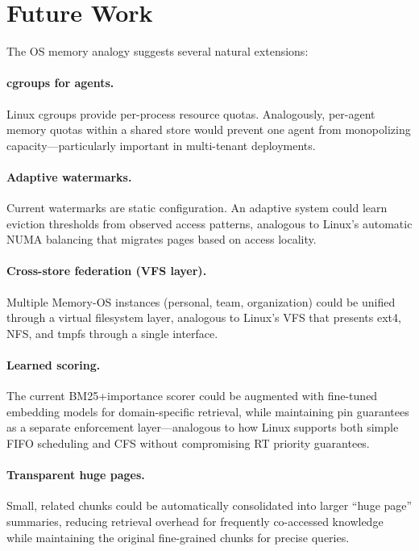 \documentclass[10pt,twocolumn]{article}
\begin{document}
\section{Future Work}
\label{sec:future}

The OS memory analogy suggests several natural extensions:

\paragraph{cgroups for agents.} Linux cgroups provide per-process resource quotas. Analogously, per-agent memory quotas within a shared store would prevent one agent from monopolizing capacity---particularly important in multi-tenant deployments.

\paragraph{Adaptive watermarks.} Current watermarks are static configuration. An adaptive system could learn eviction thresholds from observed access patterns, analogous to Linux's automatic NUMA balancing that migrates pages based on access locality.

\paragraph{Cross-store federation (VFS layer).} Multiple Memory-OS instances (personal, team, organization) could be unified through a virtual filesystem layer, analogous to Linux's VFS that presents ext4, NFS, and tmpfs through a single interface.

\paragraph{Learned scoring.} The current BM25+importance scorer could be augmented with fine-tuned embedding models for domain-specific retrieval, while maintaining pin guarantees as a separate enforcement layer---analogous to how Linux supports both simple FIFO scheduling and CFS without compromising RT priority guarantees.

\paragraph{Transparent huge pages.} Small, related chunks could be automatically consolidated into larger ``huge page'' summaries, reducing retrieval overhead for frequently co-accessed knowledge while maintaining the original fine-grained chunks for precise queries.
\end{document}
